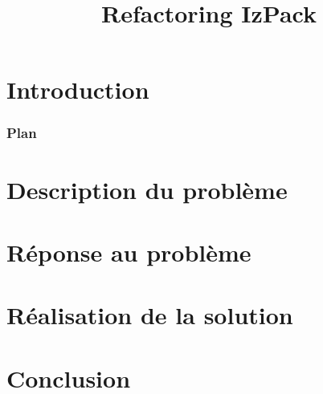 \documentclass[slidetop,11pt]{beamer}
\title{Refactoring IzPack}
\date{\oldstylenums{\today}}
\begin{document}

\section*{Introduction}

\begin{frame}\frametitle{Plan}
\tableofcontents
\end{frame}
\section{Description du problème}

\section{Réponse au problème}

\section{Réalisation de la solution}

\section*{Conclusion}

\end{document}

